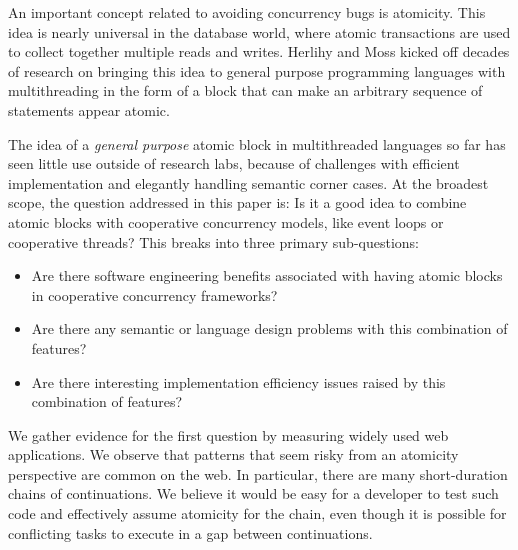 \documentclass[acmsmall,anonymous,review]{acmart}\settopmatter{printfolios=true,printccs=false,printacmref=false}
\begin{document}

An important concept related to avoiding concurrency bugs is atomicity.
This idea is nearly universal in the database world, where atomic transactions are used to collect together multiple reads and writes.
Herlihy and Moss \cite{Herlihy1993} kicked off decades of research on bringing this idea to general purpose programming languages with multithreading in the form of a block that can make an arbitrary sequence of statements appear atomic.

The idea of a \emph{general purpose} atomic block in multithreaded languages so far has seen little use outside of research labs, because of challenges with efficient implementation and elegantly handling semantic corner cases.
At the broadest scope, the question addressed in this paper is: Is it a good idea to combine atomic blocks with cooperative concurrency models, like event loops or cooperative threads?
This breaks into three primary sub-questions:
\begin{itemize}
\item Are there software engineering benefits associated with having atomic blocks in cooperative concurrency frameworks?
\item Are there any semantic or language design problems with this combination of features?
\item Are there interesting implementation efficiency issues raised by this combination of features?
\end{itemize}

We gather evidence for the first question by measuring widely used web applications\footnotemark{}.
We observe that patterns that seem risky from an atomicity perspective are common on the web.
In particular, there are many short-duration chains of continuations.
We believe it would be easy for a developer to test such code and effectively assume atomicity for the chain, even though it is possible for conflicting tasks to execute in a gap between continuations.

\end{document}
